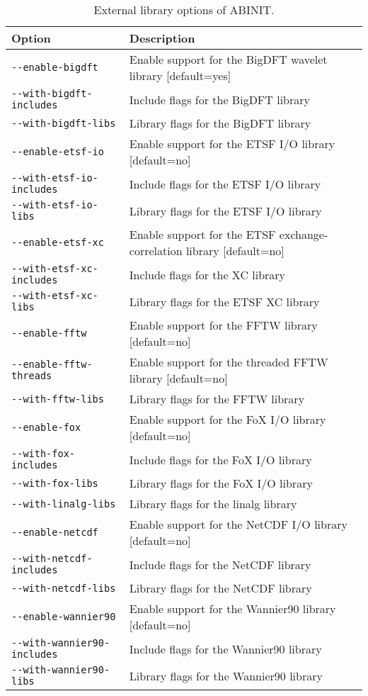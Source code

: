 %
\begin{table}
\begin{centering}
\begin{tabular}{|l|p{9cm}|}
\hline 
\textbf{Option}  & \textbf{Description} \tabularnewline
\hline 
\texttt{-{-}enable-bigdft}  & Enable support for the BigDFT wavelet library {[}default=yes{]} \tabularnewline
\texttt{-{-}with-bigdft-includes}  & Include flags for the BigDFT library \tabularnewline
\texttt{-{-}with-bigdft-libs}  & Library flags for the BigDFT library \tabularnewline
\hline 
\texttt{-{-}enable-etsf-io}  & Enable support for the ETSF I/O library {[}default=no{]} \tabularnewline
\texttt{-{-}with-etsf-io-includes}  & Include flags for the ETSF I/O library \tabularnewline
\texttt{-{-}with-etsf-io-libs}  & Library flags for the ETSF I/O library \tabularnewline
\hline 
\texttt{-{-}enable-etsf-xc}  & Enable support for the ETSF exchange-correlation library {[}default=no{]} \tabularnewline
\texttt{-{-}with-etsf-xc-includes}  & Include flags for the XC library \tabularnewline
\texttt{-{-}with-etsf-xc-libs}  & Library flags for the ETSF XC library \tabularnewline
\hline 
\texttt{-{-}enable-fftw}  & Enable support for the FFTW library {[}default=no{]} \tabularnewline
\texttt{-{-}enable-fftw-threads}  & Enable support for the threaded FFTW library {[}default=no{]} \tabularnewline
\texttt{-{-}with-fftw-libs}  & Library flags for the FFTW library \tabularnewline
\hline 
\texttt{-{-}enable-fox}  & Enable support for the FoX I/O library {[}default=no{]} \tabularnewline
\texttt{-{-}with-fox-includes}  & Include flags for the FoX I/O library \tabularnewline
\texttt{-{-}with-fox-libs}  & Library flags for the FoX I/O library \tabularnewline
\hline 
\texttt{-{-}with-linalg-libs}  & Library flags for the linalg library \tabularnewline
\hline 
\texttt{-{-}enable-netcdf}  & Enable support for the NetCDF I/O library {[}default=no{]} \tabularnewline
\texttt{-{-}with-netcdf-includes}  & Include flags for the NetCDF library \tabularnewline
\texttt{-{-}with-netcdf-libs}  & Library flags for the NetCDF library \tabularnewline
\hline 
\texttt{-{-}enable-wannier90}  & Enable support for the Wannier90 library {[}default=no{]} \tabularnewline
\texttt{-{-}with-wannier90-includes}  & Include flags for the Wannier90 library \tabularnewline
\texttt{-{-}with-wannier90-libs}  & Library flags for the Wannier90 library \tabularnewline
\hline
\end{tabular}
\par\end{centering}

\caption{External library options of ABINIT.}


\label{tab:opt-extlibs} 
\end{table}



